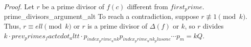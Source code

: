 \textit{Proof.} Let $r$ be a prime divisor of $f(c)$ different from ${first_prime}$. {prime_divisors_argument_alt} To reach a contradiction, suppose $r\not\equiv 1\pmod{{k}}$. Thus, $r\equiv {ell}\pmod{{k}}$ or $r$ is a prime divisor of $\Delta(f)$ or ${k}$, so $r$ divides ${k}\cdot{prev_primes_fact}{cdot_alt} t\cdot p_{{index_prime_unk}}p_{{index_prime_unk_plusone}}\cdots p_m={k}Q$.